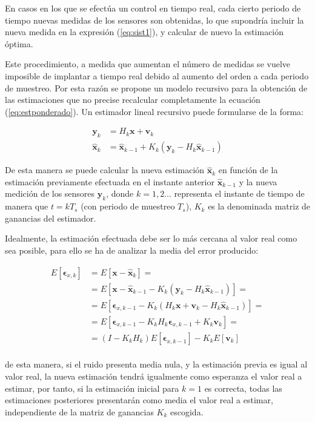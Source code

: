 En casos en los que se efectúa un control en tiempo real, cada cierto periodo de tiempo nuevas medidas de los sensores son obtenidas, lo que supondría incluir la nueva medida en la expresión (\ref{eq:sist1}), y calcular de nuevo la estimación óptima. \par 

Este procedimiento, a medida que aumentan el número de medidas se vuelve imposible de implantar a tiempo real debido al aumento del orden a cada periodo de muestreo. Por esta razón se propone un modelo recursivo para la obtención de las estimaciones que no precise recalcular completamente la ecuación (\ref{eq:estponderado}). Un estimador lineal recursivo puede formularse de la forma: 

\begin{equation}
\begin{split}
	\boldsymbol{y}_k &= H_k\boldsymbol{x} + \boldsymbol{v}_k \\
	\boldsymbol{\hat{x}}_k &= \boldsymbol{\hat{x}}_{k-1} + K_k(\boldsymbol{y}_k - H_k\boldsymbol{\hat{x}}_{k-1})
\end{split}
\label{eq:sist2}
\end{equation}

De esta manera se puede calcular la nueva estimación $\boldsymbol{\hat{x}}_k$ en función de la estimación previamente efectuada en el instante anterior $\boldsymbol{\hat{x}}_{k-1}$ y la nueva medición de los sensores $\boldsymbol{y}_k$, donde $k = 1,2 \ldots$ representa el instante de tiempo de manera que $t = kT_s$ (con periodo de muestreo $T_s$), $K_k$ es la denominada matriz de ganancias del estimador. \par 

Idealmente, la estimación efectuada debe ser lo más cercana al valor real como sea posible, para ello se ha de analizar la media del error producido: 

\[
\begin{split}
	E[\boldsymbol{\epsilon}_{x,k}] 
	&= E[\boldsymbol{x} - \boldsymbol{\hat{x}}_k] = \\
	&= E[\boldsymbol{x} - \boldsymbol{\hat{x}}_{k-1} - K_k(\boldsymbol{y}_k - H_k\boldsymbol{\hat{x}}_{k-1})] = \\
	&= E[\boldsymbol{\epsilon}_{x,k-1} - K_k(H_k\boldsymbol{x} + \boldsymbol{v}_k - H_k\boldsymbol{\hat{x}}_{k-1})] = \\
	&= E[\boldsymbol{\epsilon}_{x,k-1} - K_kH_k\boldsymbol{\epsilon}_{x,k-1} + K_k\boldsymbol{v}_k] = \\
	&= (I - K_kH_k)E[\boldsymbol{\epsilon}_{x,k-1}] - K_kE[\boldsymbol{v}_k]
\end{split}
\] \\
\noindent
de esta manera, si el ruido presenta media nula, y la estimación previa es igual al valor real, la nueva estimación tendrá igualmente como esperanza el valor real a estimar, por tanto, si la estimación inicial para $k=1$ es correcta, todas las estimaciones posteriores presentarán como media el valor real a estimar, independiente de la matriz de ganancias $K_k$ escogida. \par

